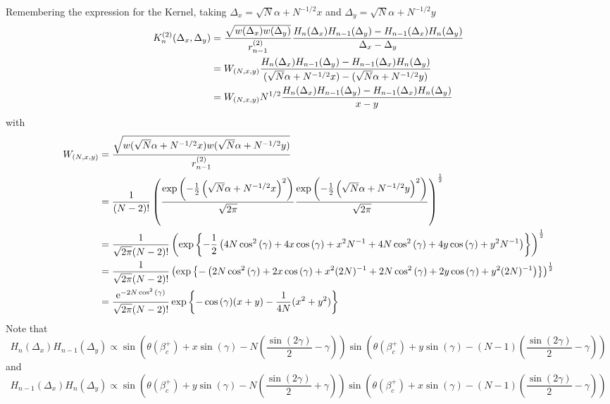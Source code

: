 Remembering the expression for the Kernel, taking $\Delta_x = \sqrt{N}\alpha + N^{-1/2} x$ and $\Delta_y = \sqrt{N}\alpha + N^{-1/2} y$
\begin{align}
	K_n^{(2)}(\Delta_x,\Delta_y) & = \frac{\sqrt{w(\Delta_x) w(\Delta_y)}}{r_{n-1}^{(2)}} \frac{H_n(\Delta_x)H_{n-1}(\Delta_y) - H_{n-1}(\Delta_x)H_n(\Delta_y)}{\Delta_x-\Delta_y} \\
	& = W_{(N,x,y)} \frac{H_n(\Delta_x)H_{n-1}(\Delta_y) - H_{n-1}(\Delta_x)H_n(\Delta_y)}{(\sqrt{N}\alpha + N^{-1/2} x)-(\sqrt{N}\alpha + N^{-1/2} y)} \\
	& = W_{(N,x,y)} N^{1/2} \frac{H_n(\Delta_x)H_{n-1}(\Delta_y) - H_{n-1}(\Delta_x)H_n(\Delta_y)}{x-y}
\end{align}
with 
\begin{align}
	W_{(N,x,y)} & = \frac{\sqrt{w(\sqrt{N}\alpha + N^{-1/2} x) w(\sqrt{N}\alpha + N^{-1/2} y)}}{r_{n-1}^{(2)}} \\
	& = \frac{1}{(N-2)!} \left(\frac{\exp{\left( -\frac{1}{2} \left(\sqrt{N}\alpha + N^{-1/2} x \right)^2 \right)}}{\sqrt{2\pi}}  \frac{\exp{\left( -\frac{1}{2} \left(\sqrt{N}\alpha + N^{-1/2} y \right)^2 \right)}}{\sqrt{2\pi}} \right)^{\frac{1}{2}} \\
	& = \frac{1}{\sqrt{2\pi} (N-2)!} \left( \exp{\left\{ -\frac{1}{2} \left( 4 N \cos^2{(\gamma)} + 4 x \cos{(\gamma)} + x^2 N^{-1} + 4 N \cos^2{(\gamma)} + 4 y \cos{(\gamma)} + y^2 N^{-1} \right) \right\}} \right)^{\frac{1}{2}} \\
	& = \frac{1}{\sqrt{2\pi} (N-2)!} \left( \exp{\left\{ - \left( 2N \cos^2{(\gamma)} + 2 x \cos{(\gamma)} + x^2 (2N)^{-1} + 2 N \cos^2{(\gamma)} + 2 y \cos{(\gamma)} + y^2 (2N)^{-1} \right) \right\}} \right)^{\frac{1}{2}} \\
	& = \frac{\operatorname{e}^{-2N\cos^2{(\gamma)}}}{\sqrt{2\pi} (N-2)!}
	\exp{\left\{-\cos{(\gamma)} (x+y) - \frac{1}{4N} (x^2 + y^2) \right\}} 
\end{align}
Note that
\begin{equation}
	H_n(\Delta_x)H_{n-1}(\Delta_y) \propto \sin{\left(\theta(\beta_c^+) + x \sin{(\gamma)}-N\left(\frac{\sin{(2\gamma)}}{2}-\gamma\right)\right)} \sin{\left(\theta(\beta_c^+) + y \sin{(\gamma)} - (N-1) \left(\frac{\sin{(2\gamma)}}{2}-\gamma\right)\right)} 
\end{equation}
and
\begin{equation}
	H_{n-1}(\Delta_x)H_n(\Delta_y) \propto \sin{\left(\theta(\beta_c^+) + y \sin{(\gamma)}- N\left(\frac{\sin{(2\gamma)}}{2}+ \gamma\right)\right)} \sin{\left(\theta(\beta_c^+) + x \sin{(\gamma)} - (N-1) \left(\frac{\sin{(2\gamma)}}{2}-\gamma\right)\right)} 
\end{equation}
